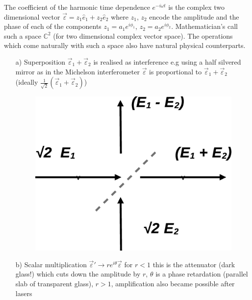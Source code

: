 The coefficient of the harmonic time dependence $e^{-i \omega t}$ is the complex two dimensional vector
$\overrightarrow{\varepsilon} = z_1 \hat{e}_1 + z_2 \hat{e}_2$ where $z_1$, $z_2$ encode the amplitude and the phase of each of
the components $z_1	 = a_1 e^{i \phi_1}$, $z_2 = a_2 e^{i\phi_2}$. Mathematician's call such a space
$\mathbb{C}^2$ (for two dimensional complex vector space). The operations which come
naturally with such a space also have natural physical counterparts.
\begin{itemize}
\item[a)] Superposition $\overrightarrow{\varepsilon}_1 + \overrightarrow{\varepsilon}_2$ is realised as interference e.g using a half silvered
mirror as in the Michelson interferometer $\overrightarrow{\varepsilon}$ is proportional to $\overrightarrow{\varepsilon}_1 + \overrightarrow{\varepsilon}_2$ (ideally	
$\frac{1}{\sqrt{2}} (\overrightarrow{\varepsilon}_1 + \overrightarrow{\varepsilon}_2)$)
\bigskip

\begin{figure}[H]
\centering
\includegraphics[scale=0.2]{src/images/chap26/beamsplitter.jpg}
\end{figure}

\item[b)] Scalar multiplication $\overrightarrow{\varepsilon}' \to re^{i\theta} \overrightarrow{\varepsilon}$ for $r < 1$ this is the attenuator (dark
glass!) which cuts down the amplitude by $r$, $\theta$ is a phase retardation (parallel slab of transparent glass), $r > 1$, amplification also became possible after lasers



\end{itemize}
